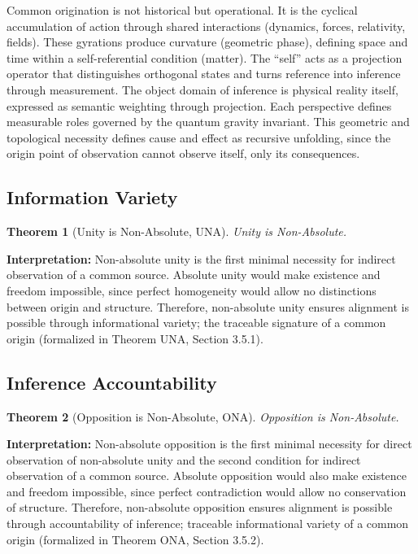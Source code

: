 \documentclass[11pt,a4paper]{article}
\newtheorem{theorem}{Theorem}
\theoremstyle{definition}
\theoremstyle{remark}
\begin{document}
Common origination is not historical but operational. It is the cyclical accumulation of action through shared interactions (dynamics, forces, relativity, fields). These gyrations produce curvature (geometric phase), defining space and time within a self-referential condition (matter). The ``self'' acts as a projection operator that distinguishes orthogonal states and turns reference into inference through measurement. The object domain of inference is physical reality itself, expressed as semantic weighting through projection. Each perspective defines measurable roles governed by the quantum gravity invariant. This geometric and topological necessity defines cause and effect as recursive unfolding, since the origin point of observation cannot observe itself, only its consequences.

\subsection{Information Variety}

\begin{theorem}[Unity is Non-Absolute, UNA]
\textit{Unity is Non-Absolute.}
\end{theorem}

\noindent\textbf{Interpretation:} 
Non-absolute unity is the first minimal necessity for indirect observation of a common source. Absolute unity would make existence and freedom impossible, since perfect homogeneity would allow no distinctions between origin and structure. Therefore, non-absolute unity ensures alignment is possible through informational variety; the traceable signature of a common origin (formalized in Theorem UNA, Section 3.5.1).

\subsection{Inference Accountability}

\begin{theorem}[Opposition is Non-Absolute, ONA]
\textit{Opposition is Non-Absolute.}
\end{theorem}

\noindent\textbf{Interpretation:} 
Non-absolute opposition is the first minimal necessity for direct observation of non-absolute unity and the second condition for indirect observation of a common source. Absolute opposition would also make existence and freedom impossible, since perfect contradiction would allow no conservation of structure. Therefore, non-absolute opposition ensures alignment is possible through accountability of inference; traceable informational variety of a common origin (formalized in Theorem ONA, Section 3.5.2).
\end{document}
